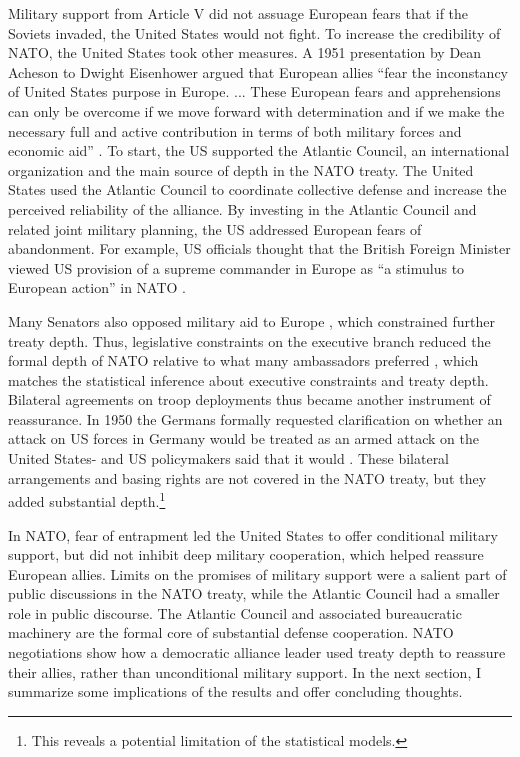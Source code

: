 \documentclass[12pt]{article}
\begin{document}
Military support from Article V did not assuage European fears that if the Soviets invaded, the United States would not fight. 
To increase the credibility of NATO, the United States took other measures.  
A 1951 presentation by Dean Acheson to Dwight Eisenhower argued that European allies ``fear the inconstancy of United States purpose in Europe. ... These European fears and apprehensions can only be overcome if we move forward with determination and if we make the necessary full and active contribution in terms of both military forces and economic aid'' \citep[pg. 3]{Acheson1951}. 
To start, the US supported the Atlantic Council, an international organization and the main source of depth in the NATO treaty. 
The United States used the Atlantic Council to coordinate collective defense and increase the perceived reliability of the alliance. 
By investing in the Atlantic Council and related joint military planning, the US addressed European fears of abandonment. 
For example, US officials thought that the British Foreign Minister viewed US provision of a supreme commander in Europe as ``a stimulus to European action'' in NATO \citep{Acheson1950}. 


Many Senators also opposed military aid to Europe \citep[pg 285]{Acheson1969}, which constrained further treaty depth. 
Thus, legislative constraints on the executive branch reduced the formal depth of NATO relative to what many ambassadors preferred \citep[pg 277]{Acheson1969}, which matches the statistical inference about executive constraints and treaty depth.  
Bilateral agreements on troop deployments thus became another instrument of reassurance. 
In 1950 the Germans formally requested clarification on whether an attack on US forces in Germany would be treated as an armed attack on the United States- and US policymakers said that it would \citep[pg. 395]{Acheson1969}.  
These bilateral arrangements and basing rights are not covered in the NATO treaty, but they added substantial depth.\footnote{This reveals a potential limitation of the statistical models.}  


In NATO, fear of entrapment led the United States to offer conditional military support, but did not inhibit deep military cooperation, which helped reassure European allies. 
Limits on the promises of military support were a salient part of public discussions in the NATO treaty, while the Atlantic Council had a smaller role in public discourse. 
The Atlantic Council and associated bureaucratic machinery are the formal core of substantial defense cooperation. 
NATO negotiations show how a democratic alliance leader used treaty depth to reassure their allies, rather than unconditional military support. 
In the next section, I summarize some implications of the results and offer concluding thoughts. 
\end{document}
